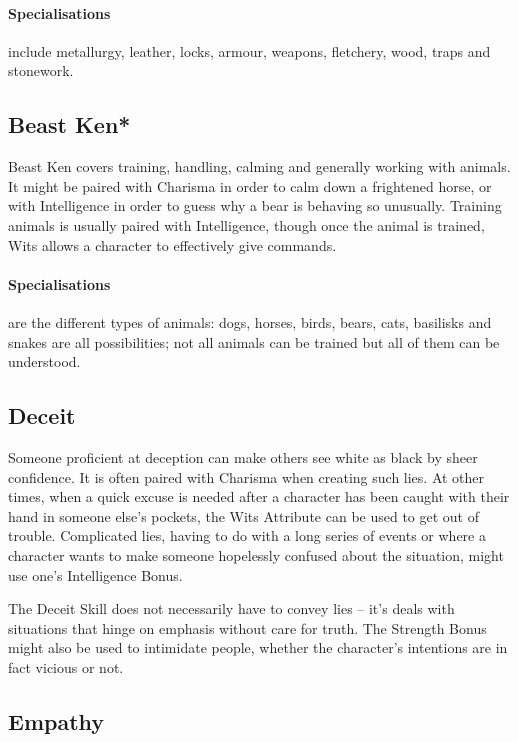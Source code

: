 \begin{multicols}{2}
\paragraph{Specialisations} include metallurgy, leather, locks, armour, weapons, fletchery, wood, traps and stonework.

\subsection{Beast Ken*}

Beast Ken covers training, handling, calming and generally working with animals. It might be paired with Charisma in order to calm down a frightened horse, or with Intelligence in order to guess why a bear is behaving so unusually. Training animals is usually paired with Intelligence, though once the animal is trained, Wits allows a character to effectively give commands.

\paragraph{Specialisations} are the different types of animals: dogs, horses, birds, bears, cats, basilisks and snakes are all possibilities; not all animals can be trained but all of them can be understood.

\subsection{Deceit}

Someone proficient at deception can make others see white as black by sheer confidence. It is often paired with Charisma when creating such lies. At other times, when a quick excuse is needed after a character has been caught with their hand in someone else's pockets, the Wits Attribute can be used to get out of trouble. Complicated lies, having to do with a long series of events or where a character wants to make someone hopelessly confused about the situation, might use one's Intelligence Bonus.

The Deceit Skill does not necessarily have to convey lies -- it's deals with situations that hinge on emphasis without care for truth.
The Strength Bonus might also be used to intimidate people, whether the character's intentions are in fact vicious or not.

\subsection{Empathy}


\end{multicols}
